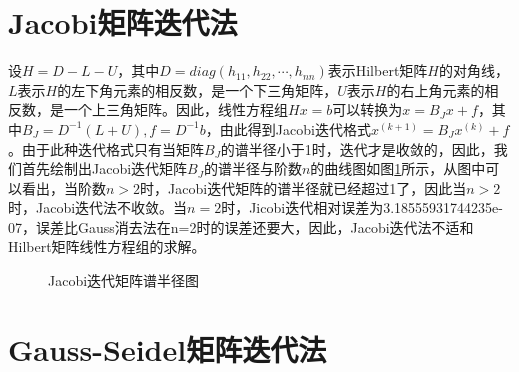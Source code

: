 \documentclass[a4paper]{article}
\begin{document}
\section{Jacobi矩阵迭代法}
设$H=D-L-U$，其中$D=diag(h_{11},h_{22},\cdots,h_{nn})$表示Hilbert矩阵$H$的对角线，$L$表示$H$的左下角元素的相反数，是一个下三角矩阵，$U$表示$H$的右上角元素的相反数，是一个上三角矩阵。因此，线性方程组$Hx=b$可以转换为$x=B_Jx+f$，其中$B_J=D^{-1}(L+U),f=D^{-1}b$，由此得到Jacobi迭代格式$x^{(k+1)}=B_Jx^{(k)}+f$。由于此种迭代格式只有当矩阵$B_J$的谱半径小于1时，迭代才是收敛的，因此，我们首先绘制出Jacobi迭代矩阵$B_J$的谱半径与阶数$n$的曲线图如图\ref{fig:5}所示，从图中可以看出，当阶数$n>2$时，Jacobi迭代矩阵的谱半径就已经超过1了，因此当$n>2$时，Jacobi迭代法不收敛。当$n=2$时，Jicobi迭代相对误差为3.18555931744235e-07，误差比Gauss消去法在n=2时的误差还要大，因此，Jacobi迭代法不适和Hilbert矩阵线性方程组的求解。

\begin{figure}[!h] \centering 
	\caption{Jacobi迭代矩阵谱半径图} 
	\label{fig:5} 
\end{figure}

\section{Gauss-Seidel矩阵迭代法}
\end{document}
